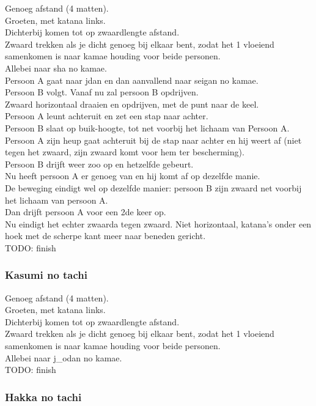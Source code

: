 Genoeg afstand (4 matten).\\
Groeten, met katana links.\\
Dichterbij komen tot op zwaardlengte afstand.\\
Zwaard trekken als je dicht genoeg bij elkaar bent, zodat het 1 vloeiend samenkomen is naar kamae houding voor beide personen.\\
Allebei naar sha no kamae.\\
Persoon A gaat naar jdan en dan aanvallend naar seigan no kamae.\\
Persoon B volgt. Vanaf nu zal persoon B opdrijven.\\
Zwaard horizontaal draaien en opdrijven, met de punt naar de keel.\\
Persoon A leunt achteruit en zet een stap naar achter.\\
Persoon B slaat op buik-hoogte, tot net voorbij het lichaam van Persoon A.\\
Persoon A zijn heup gaat achteruit bij de stap naar achter en hij weert af (niet tegen het zwaard, zijn zwaard komt voor hem ter bescherming).\\
Persoon B drijft weer zoo op en hetzelfde gebeurt.\\
Nu heeft persoon A er genoeg van en hij komt af op dezelfde manie.\\
De beweging eindigt wel op dezelfde manier: persoon B zijn zwaard net voorbij het lichaam van persoon A.\\
Dan drijft persoon A voor een 2de keer op.\\
Nu eindigt het echter zwaarda tegen zwaard. Niet horizontaal, katana's onder een hoek met de scherpe kant meer naar beneden gericht.\\
TODO: finish

\subsubsection{Kasumi no tachi}

Genoeg afstand (4 matten).\\
Groeten, met katana links.\\
Dichterbij komen tot op zwaardlengte afstand.\\
Zwaard trekken als je dicht genoeg bij elkaar bent, zodat het 1 vloeiend samenkomen is naar kamae houding voor beide personen.\\
Allebei naar j\_{o}dan no kamae.\\
TODO: finish

\subsubsection{Hakka no tachi}

